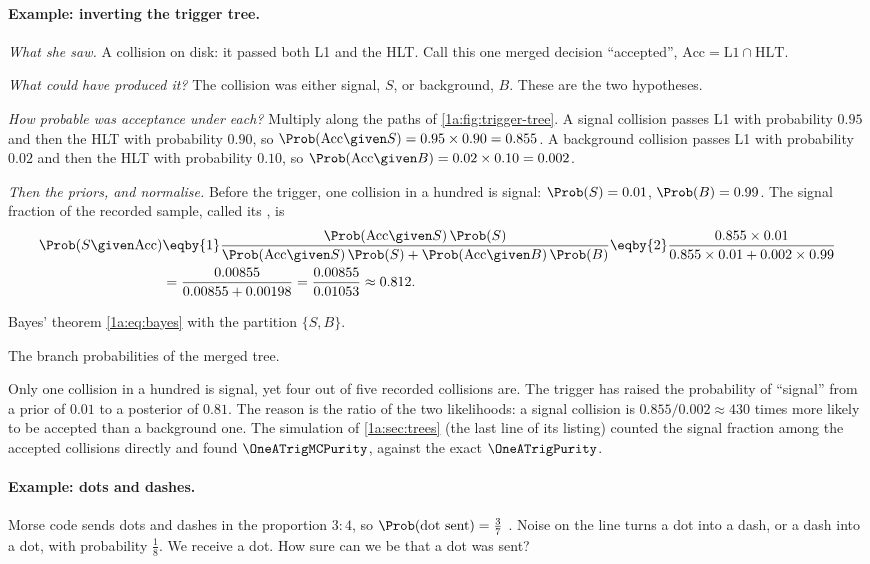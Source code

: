 \paragraph{Example: inverting the trigger tree.}
\emph{What she saw.} A collision on disk: it passed both L1 and the HLT. Call
this one merged decision ``accepted'', $\mathrm{Acc}=\mathrm{L1}\cap\mathrm{HLT}$.

\emph{What could have produced it?} The collision was either signal, $S$, or
background, $B$. These are the two hypotheses.

\emph{How probable was acceptance under each?} Multiply along the paths of
\cref{1a:fig:trigger-tree}. A signal collision passes L1 with probability
$0.95$ and then the HLT with probability $0.90$, so
$\Prob(\mathrm{Acc}\given S)=0.95\times0.90=0.855$. A background collision passes
L1 with probability $0.02$ and then the HLT with probability $0.10$, so
$\Prob(\mathrm{Acc}\given B)=0.02\times0.10=0.002$.

\emph{Then the priors, and normalise.} Before the trigger, one collision in a
hundred is signal: $\Prob(S)=0.01$, $\Prob(B)=0.99$. The signal fraction of the
recorded sample, called its , is
\begin{align*}
\Prob(S\given\mathrm{Acc})
&\eqby{1}\frac{\Prob(\mathrm{Acc}\given S)\,\Prob(S)}
               {\Prob(\mathrm{Acc}\given S)\,\Prob(S)+\Prob(\mathrm{Acc}\given B)\,\Prob(B)}
 \eqby{2}\frac{0.855\times0.01}{0.855\times0.01+0.002\times0.99}\\
&=\frac{0.00855}{0.00855+0.00198}=\frac{0.00855}{0.01053}\approx0.812 .
\end{align*}
\begin{explain}
  \item Bayes' theorem \eqref{1a:eq:bayes} with the partition $\{S,B\}$.
  \item The branch probabilities of the merged tree.
\end{explain}
Only one collision in a hundred is signal, yet four out of five recorded
collisions are. The trigger has raised the probability of ``signal'' from a
prior of $0.01$ to a posterior of $0.81$. The reason is the ratio of the two
likelihoods: a signal collision is $0.855/0.002\approx430$ times more likely to
be accepted than a background one. The simulation of \cref{1a:sec:trees} (the
last line of its listing) counted the signal fraction among the accepted
collisions directly and found $\OneATrigMCPurity$, against the exact
$\OneATrigPurity$.

\paragraph{Example: dots and dashes.}
Morse code sends dots and dashes in the proportion $3:4$, so
$\Prob(\text{dot sent})=\tfrac37$ . Noise on the line
turns a dot into a dash, or a dash into a dot, with probability $\tfrac18$. We
receive a dot. How sure can we be that a dot was sent?

